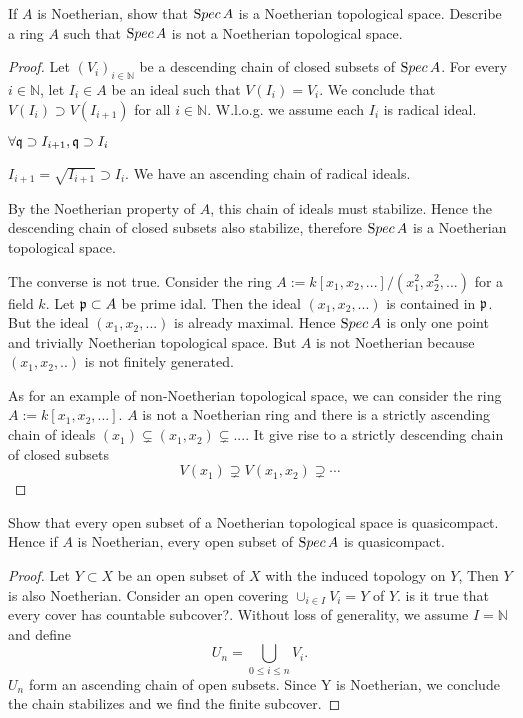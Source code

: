 \documentclass[11pt,fleqn]{book}
\begin{document}
\begin{exr}
If $A$ is Noetherian, show that ${\text Spec\,} A$ is a Noetherian topological space. Describe a ring $A$ such that ${\text Spec\,} A$ is not a Noetherian topological space.
\end{exr}
\begin{proof}
Let $(V_i)_{i\in \mathbb{N}}$ be a descending chain of closed subsets of ${\text Spec\,} A$. For every $i\in\mathbb{N}$, let $I_i\in A$ be an ideal such that $V(I_i)=V_i$. We conclude that $V(I_i)\supset V(I_{i+1})$ for all $i\in \mathbb{N}$. W.l.o.g. we assume each $I_i$ is radical ideal.

$\forall \mathfrak q\supset I_{i+1}, \mathfrak q\supset I_i$

$
I_{i+1}=\sqrt{I_{i+1}}\supset I_i.
$
We have an ascending chain of radical ideals.

By the Noetherian property of $A$, this chain of ideals must stabilize. Hence the descending chain of closed subsets also stabilize, therefore ${\text Spec\,} A$ is a Noetherian topological space.

The converse is not true. Consider the ring $A:=k[x_1,x_2,...]/(x^2_1,x^2_2,...)$ for a field $k$. Let ${\mathfrak p}\subset A$ be prime idal. Then the ideal $(x_1,x_2,...)$ is contained in ${\mathfrak p}$. But the ideal $(x_1,x_2,...)$ is already maximal. Hence ${\text Spec\,} A$ is only one point and trivially Noetherian topological space. But $A$ is not Noetherian because $(x_1,x_2,..)$ is not finitely generated.

As for an example of non-Noetherian topological space, we can consider the ring $A:=k[x_1,x_2,...]$. $A$ is not a Noetherian ring and there is a strictly ascending chain of ideals $(x_1)\subsetneq (x_1,x_2)\subsetneq ...$. It give rise to a strictly descending chain of closed subsets
$$
V(x_1)\supsetneq V(x_1,x_2)\supsetneq\cdots
$$
\end{proof}
\begin{exr}
Show that every open subset of a Noetherian topological space is quasicompact. Hence if $A$ is Noetherian, every open subset of ${\text Spec\,} A$ is quasicompact.
\end{exr}
\begin{proof}
Let $Y\subset X$ be an open subset of $X$ with the induced topology on $Y$, Then $Y$ is also Noetherian. Consider an open covering $\cup_{i\in I}V_i=Y$ of $Y$. {\color{red}is it true that every cover has countable subcover?}. Without loss of generality, we assume $I=\mathbb{N}$ and define
$$
U_n=\bigcup_{0\leq i\leq n} V_i.
$$
$U_n$ form an ascending chain of open subsets. Since Y is Noetherian, we conclude the chain stabilizes
and we find the finite subcover.
\end{proof}
\end{document}

